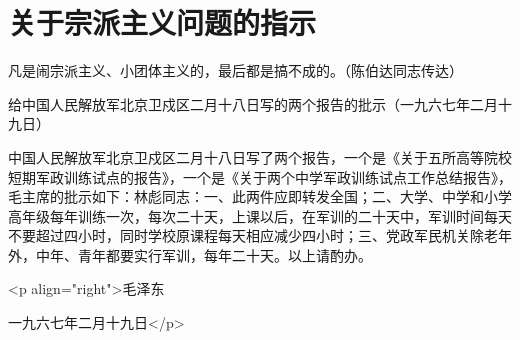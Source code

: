 \section[关于宗派主义问题的指示（一九六七年二月）]{关于宗派主义问题的指示}


凡是闹宗派主义、小团体主义的，最后都是搞不成的。（陈伯达同志传达）

给中国人民解放军北京卫戍区二月十八日写的两个报告的批示（一九六七年二月十九日）

中国人民解放军北京卫戍区二月十八日写了两个报告，一个是《关于五所高等院校短期军政训练试点的报告》，一个是《关于两个中学军政训练试点工作总结报告》，毛主席的批示如下：林彪同志：一、此两件应即转发全国；二、大学、中学和小学高年级每年训练一次，每次二十天，上课以后，在军训的二十天中，军训时间每天不要超过四小时，同时学校原课程每天相应减少四小时；三、党政军民机关除老年外，中年、青年都要实行军训，每年二十天。以上请酌办。

<p align="right">毛泽东

一九六七年二月十九日</p>


